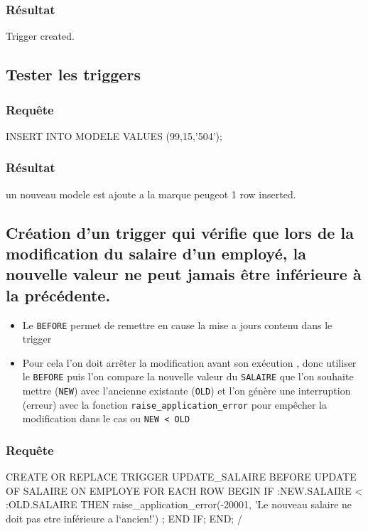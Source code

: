 \documentclass[•]{article}
\begin{document}
\subsubsection{Résultat}
\begin{sql}
Trigger created.
\end{sql}


\subsection{Tester les triggers}
\subsubsection{Requête}
\begin{sql}
INSERT INTO MODELE VALUES (99,15,'504');
\end{sql}


\subsubsection{Résultat}
\begin{sql}
un nouveau modele est ajoute a la marque peugeot
1 row inserted.
\end{sql}


\subsection{Création d'un trigger qui vérifie que lors de la modification du salaire d’un employé, 
la nouvelle valeur ne peut jamais être inférieure à la précédente.}
\begin{itemize}
\item
Le \texttt{BEFORE} permet de remettre en cause la mise a jours contenu dans le trigger
\item
Pour cela l'on doit arrêter la modification avant son exécution , donc utiliser le \texttt{BEFORE}
puis l'on compare la nouvelle valeur du \texttt{SALAIRE} que l'on souhaite mettre (\texttt{NEW}) avec l'ancienne existante (\texttt{OLD})
et l'on génère une interruption (erreur) avec la fonction \texttt{raise\_application\_error} pour empêcher la modification dans le cas ou
\texttt{NEW < OLD}
\end{itemize}

\subsubsection{Requête}
\begin{sql}
CREATE OR REPLACE TRIGGER UPDATE_SALAIRE
BEFORE UPDATE OF SALAIRE ON EMPLOYE 
FOR EACH ROW
BEGIN
	IF :NEW.SALAIRE < :OLD.SALAIRE
	THEN raise_application_error(-20001, 'Le nouveau salaire ne doit pas etre inférieure a l`ancien!') ;
	END IF;
END;
/ 
\end{sql}
\end{document}
